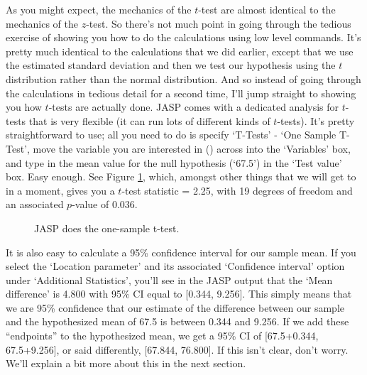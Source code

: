 
As you might expect, the mechanics of the $t$-test are almost identical to the mechanics of the $z$-test. So there's not much point in going through the tedious exercise of showing you how to do the calculations using low level commands. It's pretty much identical to the calculations that we did earlier, except that we use the estimated standard deviation and then we test our hypothesis using the $t$ distribution rather than the normal distribution. And so instead of going through the calculations in tedious detail for a second time, I'll jump straight to showing you how $t$-tests are actually done. JASP comes with a dedicated analysis for $t$-tests that is very flexible (it can run lots of different kinds of $t$-tests). It's pretty straightforward to use; all you need to do is specify `T-Tests' - `One Sample T-Test', move the variable you are interested in () across into the `Variables' box, and type in the mean value for the null hypothesis (`67.5') in the `Test value' box. Easy enough. See Figure \ref{fig:ttest_one}, which, amongst other things that we will get to in a moment, gives you a $t$-test statistic = 2.25, with 19 degrees of freedom and an associated $p$-value of 0.036. 

\vspace{0.5cm}
\begin{figure}[ht]
\begin{center}
\caption{JASP does the one-sample t-test.}
\HR
\label{fig:ttest_one}
\end{center}
\end{figure}

It is also easy to calculate a 95\% confidence interval for our sample mean. If you select the `Location parameter' and its associated `Confidence interval' option under `Additional Statistics', you'll see in the JASP output that the `Mean difference' is 4.800 with 95\% CI equal to [0.344, 9.256].  This simply means that we are 95\% confidence that our estimate of the difference between our sample and the hypothesized mean of 67.5 is between 0.344 and 9.256.  If we add these ``endpoints'' to the hypothesized mean, we get a 95\% CI of [67.5+0.344, 67.5+9.256], or said differently, [67.844, 76.800].  If this isn't clear, don't worry.  We'll explain a bit more about this in the next section.

